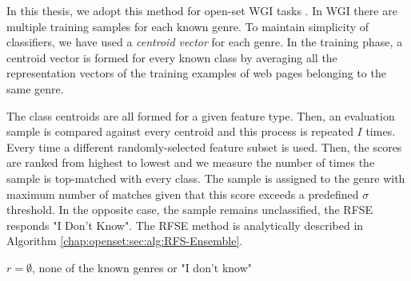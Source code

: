 In this thesis, we adopt this method for open-set WGI tasks \parencite{pritsos2013open}. In WGI there are multiple training samples for each known genre. To maintain simplicity of classifiers, we have used a \textit{centroid vector} for each genre. In the training phase, a centroid vector is formed for every known class by averaging all the representation vectors of the training examples of web pages belonging to the same genre.

The class centroids are all formed for a given feature type. Then, an evaluation sample is compared against every centroid and this process is repeated $I$ times. Every time a different randomly-selected feature subset is used. Then, the scores are ranked from highest to lowest and we measure the number of times the sample is top-matched with every class. The sample is assigned to the genre with maximum number of matches given that this score exceeds a predefined $\sigma$ threshold. In the opposite case, the sample remains unclassified, the RFSE responds "I Don't Know". The RFSE method is analytically described in Algorithm \ref{chap:openset:sec:alg:RFS-Ensemble}. 

\begin{algorithm}[t]
\caption{The \textit{RFSE} algorithm.}\label{chap:openset:sec:alg:RFS-Ensemble}

{
      $r = \emptyset$, none of the known genres or "I don't know"\;
}
\end{algorithm}

